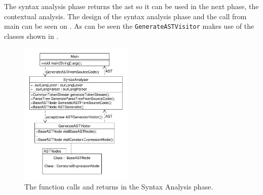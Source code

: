 The syntax analysis phase returns the \acrshort{ast} so it can be used in the next phase, the contextual analysis. 
The design of the syntax analysis phase and the call from main can be seen on .
As can be seen the \texttt{GenerateASTVisitor} makes use of the classes shown in .

\begin{figure}[h]
  \centering
    \includegraphics[width=0.48\textwidth]{figures/ClassDiagrams/SyntaxAnalyser.pdf}
  \caption{The function calls and returns in the Syntax Analysis phase.}
  \label{fig:syntaxphase}
\end{figure}